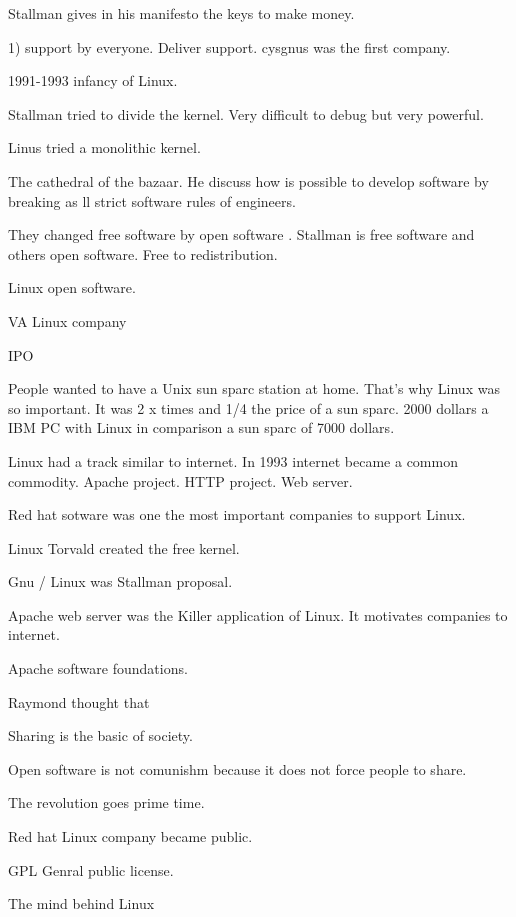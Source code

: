   
  Stallman gives in his manifesto the keys to make money. 
  
  1) support by everyone. Deliver support. 
  cysgnus was the first company. 
  
  1991-1993 infancy of Linux. 
  
  Stallman tried to divide the kernel. Very difficult to debug but very powerful. 
  
  Linus tried a monolithic kernel. 
  
  
  
  The cathedral of the bazaar. He discuss how is possible to develop software by breaking as ll strict software rules of engineers.  
  
  
  They changed free software by open software .
  Stallman is free software and others open software. Free to redistribution. 
  
  Linux open software.
  
  VA Linux company 
  
  IPO 
  
  People wanted to have a Unix sun sparc station at home. That's why Linux was so important.
  It was 2 x times and 1/4 the price of a sun sparc. 
  2000 dollars a IBM PC with Linux in comparison a sun sparc of 7000 dollars. 
  
  Linux had a track similar to internet. In 1993 internet became a common commodity. 
  Apache project. HTTP project. Web server. 
  
  Red hat sotware was one the most important companies to support Linux. 
  
  Linux Torvald created the free kernel. 
  
  
  
  Gnu / Linux was Stallman proposal. 
  
  Apache web server was the Killer application of Linux. It motivates companies to internet. 
  
  Apache software foundations. 
  
  Raymond thought that 
  
  
  Sharing is the basic of society. 
  
  Open software is not comunishm because it does not force people to share. 
  
  The revolution goes prime time. 
  
  Red hat Linux company became public. 
  
  
  GPL Genral public license. 
  
  
  The mind behind Linux 
  
